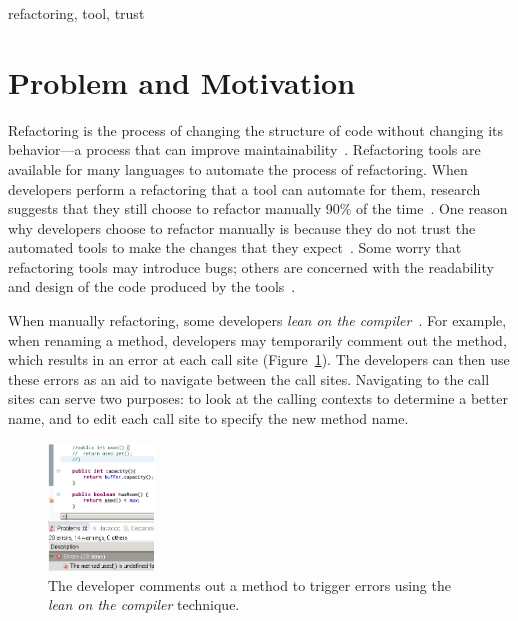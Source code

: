 \documentclass{sigplanconf}
\begin{document}

\keywords
refactoring, tool, trust


\section{Problem and Motivation}
Refactoring is the process of changing the structure of code without changing
its behavior---a process that can improve
maintainability~\cite{maintainability}.
Refactoring tools are available for many languages to automate the process of
refactoring. When developers perform a refactoring that a tool can automate for
them, research suggests that they still choose to refactor manually 90\% of the
time~\cite{how-refactor}. One reason why developers choose to refactor
manually is because they do not
trust the automated tools to make the changes
that they expect~\cite{how-refactor, say-refactor}. 
Some worry that refactoring tools may introduce bugs; others
are concerned with the readability and design of the code produced by the
tools~\cite{say-refactor}.

When manually refactoring, some developers
\textit{lean on the compiler}~\cite{legacy-code, how-refactor}.
For example, when renaming a method, developers may temporarily comment
out the method, which results
in an error at each call site (Figure~\ref{comment}). The developers can then
use these errors as an aid to navigate between the call sites.
Navigating to the call sites can serve two purposes: to look at the calling
contexts to determine a better name, and to edit each call site to specify
the new method name.

\begin{figure}[h]
\begin{center}
\includegraphics[width=0.25\textwidth]{comment.png}
\caption{The developer comments out a method to trigger errors using the
\textit{lean on the compiler} technique.\label{comment}}
\end{center}
\end{figure}
\end{document}
